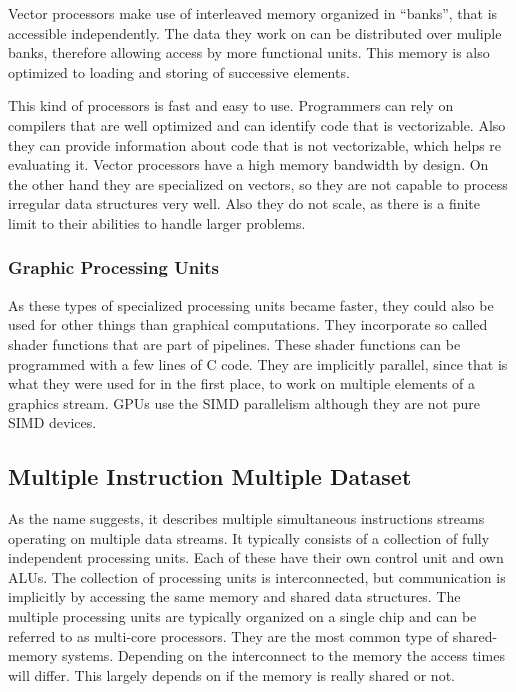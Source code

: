 \documentclass{article}
\begin{document}
	Vector processors make use of interleaved memory organized in “banks”,
	that is accessible independently.
	The data they work on can be distributed over muliple banks,
	therefore allowing access by more functional units.
	This memory is also optimized to loading and storing of successive elements.

	This kind of processors is fast and easy to use. 
	Programmers can rely on compilers that are well optimized
	and can identify code that is vectorizable.
	Also they can provide information about code that is not vectorizable,
	which helps re evaluating it.
	Vector processors have a high memory bandwidth by design.
	On the other hand they are specialized on vectors,
	so they are not capable to process irregular data structures very well.
	Also they do not scale,
	as there is a finite limit to their abilities to handle larger problems.
	
	\subsubsection{Graphic Processing Units} %
	\label{ssub:graphic_processing_units}
	As these types of specialized processing units became faster,
	they could also be used for other things than graphical computations.
	They incorporate so called shader functions that are part of pipelines.
	These shader functions can be programmed with a few lines of C code.
	They are implicitly parallel, since that is what they were used for in the first place,
	to work on multiple elements of a graphics stream.
	GPUs use the SIMD parallelism although they are not pure SIMD devices.

\subsection{Multiple Instruction Multiple Dataset} %
\label{sub:multiple_instruction_multiple_dataset}
As the name suggests,
it describes multiple simultaneous instructions streams operating on multiple data streams.
It typically consists of a collection of fully independent processing units.
Each of these have their own control unit and own ALUs.
The collection of processing units is interconnected,
but communication is implicitly by accessing the same memory and shared data structures.
The multiple processing units are typically organized on a single chip
and can be referred to as multi-core processors.
They are the most common type of shared-memory systems.
Depending on the interconnect to the memory the access times will differ. 
This largely depends on if the memory is really shared or not.
\end{document}
